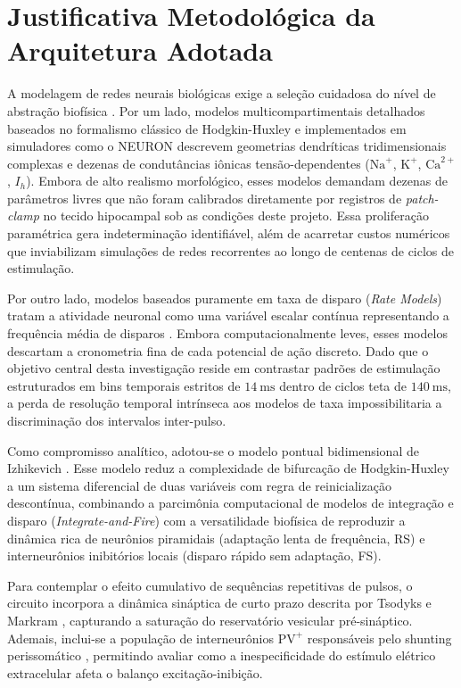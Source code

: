 \documentclass[12pt,openright,oneside,a4paper,brazil]{abntex2}
\begin{document}
\section{Justificativa Metodológica da Arquitetura Adotada}

A modelagem de redes neurais biológicas exige a seleção cuidadosa do nível de abstração biofísica \cite{dayan2001, gerstner2014}. Por um lado, modelos multicompartimentais detalhados baseados no formalismo clássico de Hodgkin-Huxley \cite{hodgkin1952} e implementados em simuladores como o \textsf{NEURON} descrevem geometrias dendríticas tridimensionais complexas e dezenas de condutâncias iônicas tensão-dependentes ($\text{Na}^+$, $\text{K}^+$, $\text{Ca}^{2+}$, $I_h$). Embora de alto realismo morfológico, esses modelos demandam dezenas de parâmetros livres que não foram calibrados diretamente por registros de \emph{patch-clamp} no tecido hipocampal sob as condições deste projeto. Essa proliferação paramétrica gera indeterminação identifiável, além de acarretar custos numéricos que inviabilizam simulações de redes recorrentes ao longo de centenas de ciclos de estimulação.

Por outro lado, modelos baseados puramente em taxa de disparo (\emph{Rate Models}) tratam a atividade neuronal como uma variável escalar contínua representando a frequência média de disparos \cite{dayan2001}. Embora computacionalmente leves, esses modelos descartam a cronometria fina de cada potencial de ação discreto. Dado que o objetivo central desta investigação reside em contrastar padrões de estimulação estruturados em bins temporais estritos de $\qty{14}{\milli\second}$ dentro de ciclos teta de $\qty{140}{\milli\second}$, a perda de resolução temporal intrínseca aos modelos de taxa impossibilitaria a discriminação dos intervalos inter-pulso.

Como compromisso analítico, adotou-se o modelo pontual bidimensional de Izhikevich \cite{izhikevich2003, izhikevich2007}. Esse modelo reduz a complexidade de bifurcação de Hodgkin-Huxley a um sistema diferencial de duas variáveis com regra de reinicialização descontínua, combinando a parcimônia computacional de modelos de integração e disparo (\emph{Integrate-and-Fire}) com a versatilidade biofísica de reproduzir a dinâmica rica de neurônios piramidais (adaptação lenta de frequência, RS) e interneurônios inibitórios locais (disparo rápido sem adaptação, FS).

Para contemplar o efeito cumulativo de sequências repetitivas de pulsos, o circuito incorpora a dinâmica sináptica de curto prazo descrita por Tsodyks e Markram \cite{tsodyks1997, tsodyks1998}, capturando a saturação do reservatório vesicular pré-sináptico. Ademais, inclui-se a população de interneurônios $\text{PV}^+$ responsáveis pelo shunting perissomático \cite{buzsaki2006}, permitindo avaliar como a inespecificidade do estímulo elétrico extracelular afeta o balanço excitação-inibição.
\end{document}
